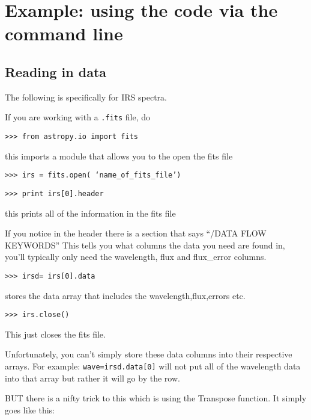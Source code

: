 \documentclass{article}
\begin{document}
\section{Example: using the code via the command line} \label{commandline}

\subsection{Reading in data}

The following is specifically for IRS spectra.

If you are working with a \texttt{.fits} file, do

\vspace{2mm}
\texttt{>>> from astropy.io import fits}  
\vspace{2mm}

this imports a module that allows you to the open the fits file 

\vspace{2mm}
\texttt{>>> irs = fits.open( ‘name\_of\_fits\_file’)}
\vspace{2mm}

\vspace{2mm}	
\texttt{>>> print irs[0].header}  
\vspace{2mm}
	
this prints all of the information in the fits file
	
If you notice in the header there is a section that says ``/DATA FLOW KEYWORDS'' This tells you what columns the data you need are found in, you’ll typically only need the wavelength, flux and flux\_error columns. 

\vspace{2mm}
\texttt{>>> irsd= irs[0].data}
\vspace{2mm}	

stores the data array that includes the wavelength,flux,errors etc.
	   
\vspace{2mm}
\texttt{>>> irs.close()}   
\vspace{2mm}	

This just closes the fits file.

Unfortunately, you can’t simply store these data columns into their respective arrays.
For example: \texttt{wave=irsd.data[0]} will not put all of the wavelength data into that array but rather it will go by the row. 

BUT there is a nifty trick to this which is using the Transpose function. It simply goes like this:
\end{document}
